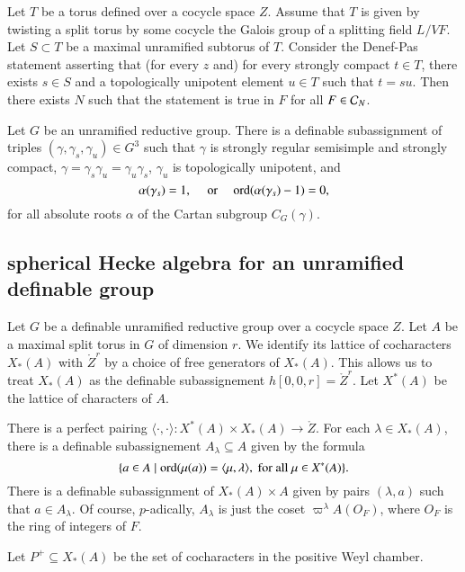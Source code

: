 \begin{lemma} Let $T$ be a torus defined over a cocycle space $Z$. Assume that $T$ is given by twisting a split torus by some cocycle the Galois group
of a splitting field $L/VF$.  Let $S\subset T$ be a maximal unramified subtorus of $T$.  Consider the Denef-Pas statement asserting that (for every $z$ and) for
every strongly compact $t\in T$, 
there exists $s\in S$ and a topologically unipotent element $u\in T$ such that $t =s u$.  Then there exists $N$ such that the statement is
true in $F$ for all $F\in \mathcal C_N$.
\end{lemma}

\begin{lemma} 
Let $G$ be an unramified reductive group.  There is a definable subassignment of triples $(\gamma,\gamma_s,\gamma_u)\in G^3$
 such that $\gamma$ is strongly regular semisimple and strongly compact, 
$\gamma = \gamma_s \gamma_u = \gamma_u\gamma_s$, $\gamma_u$ is topologically unipotent, and
\[
\alpha(\gamma_s)=1,\quad\text{ or }\quad {\operatorname{ord}}(\alpha(\gamma_s)-1)=0,
\]
for all absolute roots $\alpha$ of the Cartan subgroup $C_G(\gamma)$.
\end{lemma}


\subsection{spherical Hecke algebra for an unramified definable group}

Let $G$ be a definable unramified reductive group over a cocycle space $Z$.  Let $A$ be a maximal split torus in $G$ of dimension
$r$.  We identify its lattice of cocharacters $X_*(A)$ with $\ring{Z}^r$ by a choice of free generators of $X_*(A)$.
This allows us to treat $X_*(A)$ as the definable subassignement $h[0,0,r] = \ring{Z}^r$.  Let $X^*(A)$ be the lattice of
characters of $A$.

There is a perfect pairing $\langle\cdot,\cdot\rangle:X^*(A)\times X_*(A) \to \ring{Z}$.
For each $\lambda\in X_*(A)$, there is a definable subassignement $A_\lambda \subseteq A$ given by the formula
\[
\{ a \in A \mid {\operatorname{ord}}(\mu(a)) = \langle{\mu,\lambda}\rangle,\text{ for all } \mu\in X^*(A) \}.
\]
There is a definable subassignment of $X_*(A)\times A$
given by pairs $(\lambda,a)$  such that $a\in A_\lambda$.  
Of course, $p$-adically, $A_\lambda$ is just the coset $\varpi^\lambda A(O_F)$, where $O_F$ is the ring of integers of $F$.

Let $P^+\subseteq X_*(A)$ be the set of cocharacters in the positive Weyl chamber.

